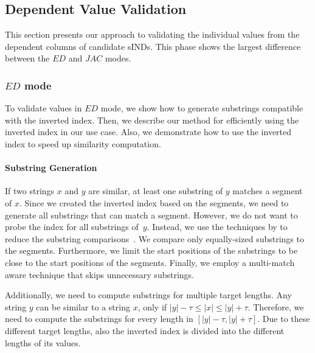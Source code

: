 \subsection{Dependent Value Validation}
This section presents our approach to validating the individual values from the dependent columns of candidate sINDs.
This phase shows the largest difference between the $ED$ and $JAC$ modes.

\subsubsection{$ED$ mode}
To validate values in $ED$ mode, we show how to generate substrings compatible with the inverted index. Then, we describe our method for efficiently using the inverted index in our use case. Also, we demonstrate how to use the inverted index to speed up similarity computation. 

\paragraph{Substring Generation}
If two strings $x$ and $y$ are similar, at least one substring of $y$ matches a segment of $x$.
Since we created the inverted index based on the segments, we need to generate all substrings that can match a segment.
However, we do not want to probe the index for all substrings of~$y$.
Instead, we use the techniques by \citeauthor{PassJoin} to reduce the substring comparisons~\cite{PassJoin}.
We compare only equally-sized substrings to the segments.
Furthermore, we limit the start positions of the substrings to be close to the start positions of the segments.
Finally, we employ a multi-match aware technique that skips unnecessary substrings.

Additionally, we need to compute substrings for multiple target lengths.
Any string $y$ can be similar to a string $x$, only if $|y| - \tau \leq |x| \leq |y| + \tau$.
Therefore, we need to compute the substrings for every length in $[|y| - \tau, |y| + \tau]$.
Due to these different target lengths, also the inverted index is divided into the different lengths of its values.

